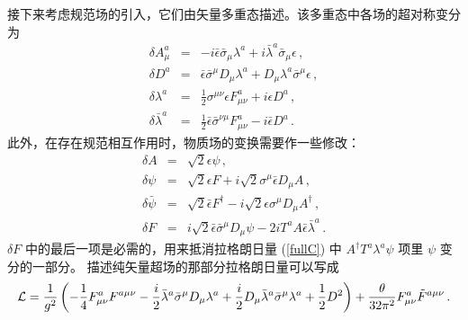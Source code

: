 接下来考虑规范场的引入，它们由矢量多重态描述。该多重态中各场的超对称变分为
\begin{equation}
\begin{array}{lll}
\delta A^a_\mu &=& -i\bar{\epsilon}\bar{\sigma}_\mu\lambda^a +
i \bar{\lambda}^a \bar{\sigma}_\mu\epsilon \,,\\
\delta D^{a} &=&\bar{\epsilon}\bar{\sigma}^\mu D_\mu \lambda^a +
D_\mu \lambda^{a} \bar{\sigma}^\mu \epsilon \,,\\
\delta\lambda^a &=& \frac{1}{2} \sigma^{\mu\nu}\epsilon F^a_{\mu\nu} 
+ i\epsilon D^a \,,\\
\delta\bar{\lambda}^a &=&\frac{1}{2}\bar{\epsilon}\bar{\sigma}^{\nu
\mu} F^a_{\mu\nu} - i \bar{\epsilon} D^a \,.
\end{array}
\label{str1-g}
\end{equation}
此外，在存在规范相互作用时，物质场的变换需要作一些修改：
\begin{equation}
\begin{array}{lll}
\delta A &=& \sqrt{2} \epsilon \psi \,,\\
\delta \psi &=& \sqrt{2} \epsilon F + i \sqrt{2} \sigma^\mu
\bar{\epsilon} D_\mu A \,,\\
\delta\bar{\psi}&=&\sqrt{2}\bar{\epsilon} F^\dagger -i\sqrt{2}
\epsilon \sigma^\mu D_\mu A^\dagger \,,\\
\delta F &=& i\sqrt{2}\bar{\epsilon} \bar{\sigma}^\mu D_\mu \psi - 
2i T^a A \bar{\epsilon} \bar{\lambda}^a\,.
\end{array}
\label{str1-m}
\end{equation}
$\delta F$ 中的最后一项是必需的，用来抵消拉格朗日量
(\ref{fullC}) 中 $A^\dagger T^a\lambda^a\psi$ 项里 $\psi$ 变分的一部分。
描述纯矢量超场的那部分拉格朗日量可以写成
$$
{\cal L}=\frac{1}{g^2}\left(-\frac{1}{4} F^a_{\mu\nu} F^{a\mu\nu}-
\frac{i}{2}\bar\lambda^a\bar\sigma^\mu D_\mu\lambda^a+\frac{i}{2}
D_\mu \bar\lambda^a\bar\sigma^\mu\lambda^a+\frac{1}{2}D^{2} \right) + 
\frac{\theta}{32 \pi^2} F^a_{\mu\nu} \tilde{F}^{a\mu\nu} \,.
$$
